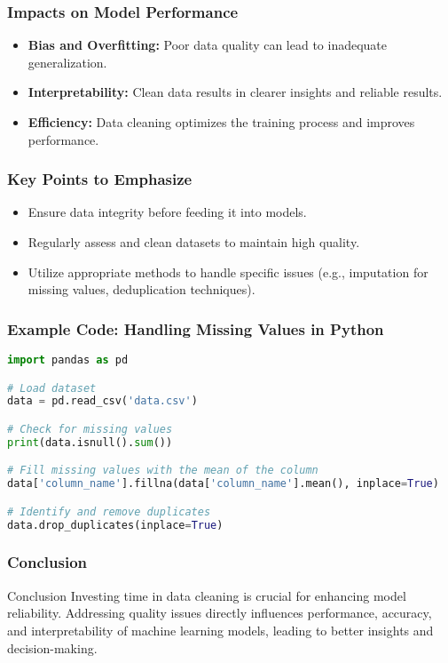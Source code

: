 \documentclass[aspectratio=169]{beamer}
\begin{document}
\begin{frame}[fragile]
    \frametitle{Impacts on Model Performance}
    \begin{itemize}
        \item \textbf{Bias and Overfitting:} Poor data quality can lead to inadequate generalization.
        \item \textbf{Interpretability:} Clean data results in clearer insights and reliable results.
        \item \textbf{Efficiency:} Data cleaning optimizes the training process and improves performance.
    \end{itemize}
\end{frame}

\begin{frame}[fragile]
    \frametitle{Key Points to Emphasize}
    \begin{itemize}
        \item Ensure data integrity before feeding it into models.
        \item Regularly assess and clean datasets to maintain high quality.
        \item Utilize appropriate methods to handle specific issues (e.g., imputation for missing values, deduplication techniques).
    \end{itemize}
\end{frame}

\begin{frame}[fragile]
    \frametitle{Example Code: Handling Missing Values in Python}
    \begin{lstlisting}[language=Python]
import pandas as pd

# Load dataset
data = pd.read_csv('data.csv')

# Check for missing values
print(data.isnull().sum())

# Fill missing values with the mean of the column
data['column_name'].fillna(data['column_name'].mean(), inplace=True)

# Identify and remove duplicates
data.drop_duplicates(inplace=True)
    \end{lstlisting}
\end{frame}

\begin{frame}[fragile]
    \frametitle{Conclusion}
    \begin{block}{Conclusion}
        Investing time in data cleaning is crucial for enhancing model reliability. Addressing quality issues directly influences performance, accuracy, and interpretability of machine learning models, leading to better insights and decision-making.
    \end{block}
\end{frame}
\end{document}
